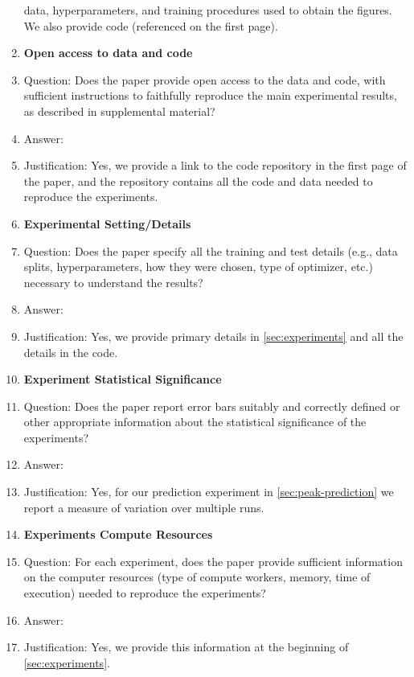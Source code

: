 \begin{enumerate}
      data, hyperparameters, and training procedures used to obtain the figures. We also provide code (referenced on the first page).
\item {\bf Open access to data and code}
    \item[] Question: Does the paper provide open access to the data and code, with sufficient instructions to faithfully reproduce the main experimental results, as described in supplemental material?
    \item[] Answer: \answerYes{}
    \item[] Justification: Yes, we provide a link to the code repository in the first page of the paper, and the repository contains all the code and data needed to reproduce the experiments.
\item {\bf Experimental Setting/Details}
    \item[] Question: Does the paper specify all the training and test details (e.g., data splits, hyperparameters, how they were chosen, type of optimizer, etc.) necessary to understand the results?
    \item[] Answer: \answerYes{}
    \item[] Justification: Yes, we provide primary details in \cref{sec:experiments} and all the details in the code.
\item {\bf Experiment Statistical Significance}
    \item[] Question: Does the paper report error bars suitably and correctly defined or other appropriate information about the statistical significance of the experiments?
    \item[] Answer: \answerYes
    \item[] Justification: Yes, for our prediction experiment in \cref{sec:peak-prediction} we report a measure of variation over multiple runs.
      
\item {\bf Experiments Compute Resources}
    \item[] Question: For each experiment, does the paper provide sufficient information on the computer resources (type of compute workers, memory, time of execution) needed to reproduce the experiments?
    \item[] Answer: \answerYes
    \item[] Justification: Yes, we provide this information at the beginning of \cref{sec:experiments}.
    

\end{enumerate}
